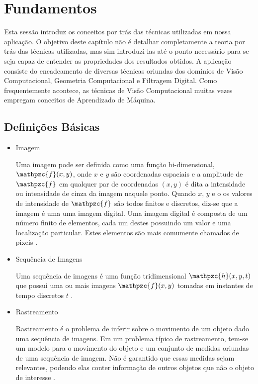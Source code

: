 \chapter{Fundamentos\label{chap:FundamentacaoMatematica}}

Esta sessão introduz os conceitos por trás das técnicas utilizadas em nossa
aplicação. O objetivo deste capítulo não é  detalhar completamente a teoria
por trás das técnicas utilizadas, mas sim introduzi-las até o ponto necessário
para se seja capaz de entender as propriedades dos resultados obtidos. A
aplicação consiste do encadeamento de diversas técnicas oriundas dos domínios de 
Visão Computacional, Geometria Computacional e Filtragem Digital. Como
frequentemente acontece, as técnicas de Visão Computacional muitas vezes
empregam conceitos de Aprendizado de Máquina. 


\section{Definições Básicas}

\begin{itemize}
\item Imagem

Uma imagem pode ser definida como uma função bi-dimensional, $\mathpzc{f}(x,y)$, onde $x$ e $y$ são coordenadas espaciais e a amplitude de $\mathpzc{f}$ em qualquer par de coordenadas $(x,y)$ é dita a intensidade ou intensidade de cinza da imagem naquele ponto. Quando $x$, $y$ e o os valores de intensidade de $\mathpzc{f}$ são todos finitos e discretos, diz-se que a imagem é uma uma imagem digital. Uma imagem digital é composta de um número finito de elementos, cada um destes possuindo um valor e uma localização particular. Estes elementos são mais comumente chamados de pixeis \cite{gonzalesDigitalImageProc}.

\item Sequência de Imagens

Uma sequência de imagens é uma função tridimensional $\mathpzc{h}(x,y,t)$ que possui uma ou mais imagens $\mathpzc{f}(x,y)$ tomadas em instantes de tempo discretos $t$ \cite{def:imageSequence}.

\item Rastreamento

Rastreamento é o problema de inferir sobre o movimento de um objeto dado uma sequência de imagens. Em um problema típico de rastreamento, tem-se um modelo para o movimento do objeto e um conjunto de medidas oriundas de uma sequência de imagem. Não é garantido que essas medidas sejam relevantes, podendo elas conter informação de outros objetos que não o objeto de interesse \cite{computer-vision-modern-approach-forsithy}.

\end{itemize}


